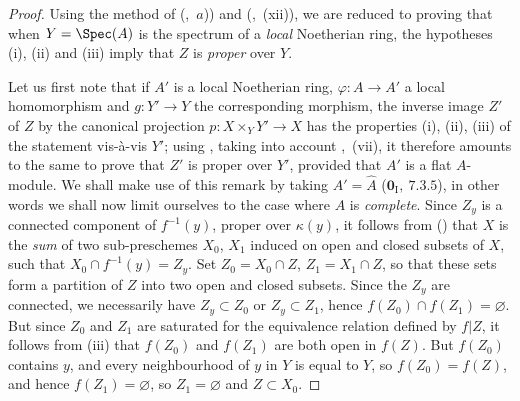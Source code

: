 \begin{proof}
Using the method of (,~$a$)) and (,~(xii)), we are reduced to proving that when $Y=\Spec(A)$ is the spectrum of a \emph{local} Noetherian ring, the hypotheses (i), (ii) and (iii) imply that $Z$ is \emph{proper} over $Y$.

Let us first note that if $A'$ is a local Noetherian ring, $\varphi:A\to A'$ a local homomorphism and $g:Y'\to Y$ the corresponding morphism, the inverse image $Z'$ of $Z$ by the canonical projection $p:X\times_Y Y'\to X$ has the properties (i), (ii), (iii) of the statement vis-\`a-vis $Y'$; using , taking into account ,~(vii), it therefore amounts to the same to prove that $Z'$ is proper over $Y'$, provided that $A'$ is a flat $A$-module.
We shall make use of this remark by taking $A'=\hat{A}$ ($\mathbf{0}_{\mathrm{I}},~7.3.5$), in other words we shall now limit ourselves to the case where $A$ is \emph{complete}.
Since $Z_y$ is a connected component of $f^{-1}(y)$, proper over $\kappa(y)$, it follows from () that $X$ is the \emph{sum} of two sub-preschemes $X_0$, $X_1$ induced on open and closed subsets of $X$, such that $X_0\cap f^{-1}(y)=Z_y$.
Set $Z_0=X_0\cap Z$, $Z_1=X_1\cap Z$, so that these sets form a partition of $Z$ into two open and closed subsets.
Since the $Z_y$ are connected, we necessarily have $Z_y\subset Z_0$ or $Z_y\subset Z_1$, hence $f(Z_0)\cap f(Z_1)=\varnothing$.
But since $Z_0$ and $Z_1$ are saturated for the equivalence relation defined by $f|Z$, it follows from (iii) that $f(Z_0)$ and $f(Z_1)$ are both open in $f(Z)$.
But $f(Z_0)$ contains $y$, and every neighbourhood of $y$ in $Y$ is equal to $Y$, so $f(Z_0)=f(Z)$, and hence $f(Z_1)=\varnothing$, so $Z_1=\varnothing$ and $Z\subset X_0$.


\end{proof}
